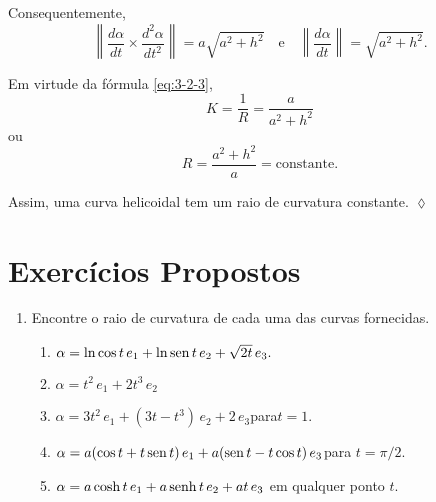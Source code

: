 Consequentemente,
\begin{equation*}
\left\|\dfrac{d\alpha}{dt}\times \dfrac{d^{2}\alpha}{dt^{2}}\right\|=a\sqrt{a^{2}+h^{2}} \quad \text{e}\quad 
\left\|\dfrac{d\alpha}{dt}\right\|= \sqrt{a^{2}+h^{2}}. 
\end{equation*}

Em virtude da fórmula \eqref{eq:3-2-3},
\begin{equation*}
K=\dfrac{1}{R}=\dfrac{a}{a^{2}+h^{2}}
\end{equation*}
ou
\begin{equation*}
R= \dfrac{a^{2}+h^{2}}{a}=\text{constante}.
\end{equation*}

Assim, uma curva helicoidal tem um raio de curvatura constante. \hfill \(\lozenge\)

\section*{Exercícios Propostos}
\begin{enumerate}[label=(\arabic*),ref=(\arabic*)]
\item Encontre o raio de curvatura de cada uma das curvas fornecidas.
\begin{enumerate}
\item \(\alpha =\ln \cos t\, e_{1} +\ln \operatorname{sen} t\, e_{2} +\sqrt{2t}\, e_{3}.\)
\item \(\alpha =t^{2}\,e_{1} + 2t^{3}\,e_{2}\)	
\item  \(\alpha =3t^{2}\, e_{1}+(3t-t^{3})\,e_{2}+2\, e_{3}\)\quad  para\quad  \(t=1\).
\item \(\alpha = a (\cos t + t \operatorname{sen} t)\,e_{1} + a (\operatorname{sen} t - t \cos t)\, e_{3}\)\quad  para \quad  \(t=\pi/2\).
\item \(\alpha =a \cosh t\, e_{1} +a\operatorname{senh} t\,e_{2} + at\,e_{3}\) \quad  em qualquer ponto \quad \(t\).
\end{enumerate}	
\end{enumerate}

